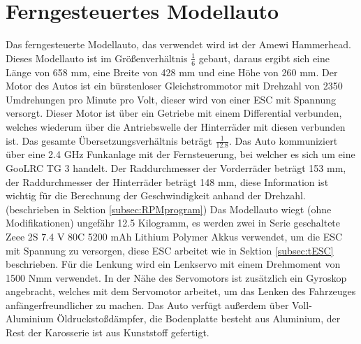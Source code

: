 \section{Ferngesteuertes Modellauto}
\label{sec:Auto}
Das ferngesteuerte Modellauto, das verwendet wird ist der Amewi Hammerhead. Dieses Modellauto ist im Größenverhältnis $\frac{1}{6}$ gebaut, daraus ergibt sich eine Länge von 658 \ac{mm}, eine Breite von 428 \ac{mm} und eine Höhe von 260 \ac{mm}. Der Motor des Autos ist ein bürstenloser Gleichstrommotor mit Drehzahl von 2350 Umdrehungen pro Minute pro Volt, dieser wird von einer \ac{ESC} mit Spannung versorgt. Dieser Motor ist über ein Getriebe mit einem Differential verbunden, welches wiederum über die Antriebswelle der Hinterräder mit diesen verbunden ist. Das gesamte Übersetzungsverhältnis beträgt $\frac{1}{12.8}$. Das Auto kommuniziert über eine 2.4 \ac{GHz} Funkanlage mit der Fernsteuerung, bei welcher es sich um eine GooLRC TG 3 handelt. Der Raddurchmesser der Vorderräder beträgt 153 \ac{mm}, der Raddurchmesser der Hinterräder beträgt 148 \ac{mm}, diese Information ist wichtig für die Berechnung der Geschwindigkeit anhand der Drehzahl. (beschrieben in Sektion \ref{subsec:RPMprogram}) Das Modellauto wiegt (ohne Modifikationen) ungefähr 12.5 Kilogramm, es werden zwei in Serie geschaltete Zeee 2S 7.4 \ac{V} 80C 5200 \ac{mAh} Lithium Polymer Akkus verwendet, um die \ac{ESC} mit Spannung zu versorgen, diese \ac{ESC} arbeitet wie in Sektion \ref{subsec:tESC} beschrieben. Für die Lenkung wird ein Lenkservo mit einem Drehmoment von 1500 \ac{Nmm} verwendet. In der Nähe des Servomotors ist zusätzlich ein Gyroskop angebracht, welches mit dem Servomotor arbeitet, um das Lenken des Fahrzeuges anfängerfreundlicher zu machen. Das Auto verfügt außerdem über Voll-Aluminium Öldruckstoßdämpfer, die Bodenplatte besteht aus Aluminium, der Rest der Karosserie ist aus Kunststoff gefertigt.